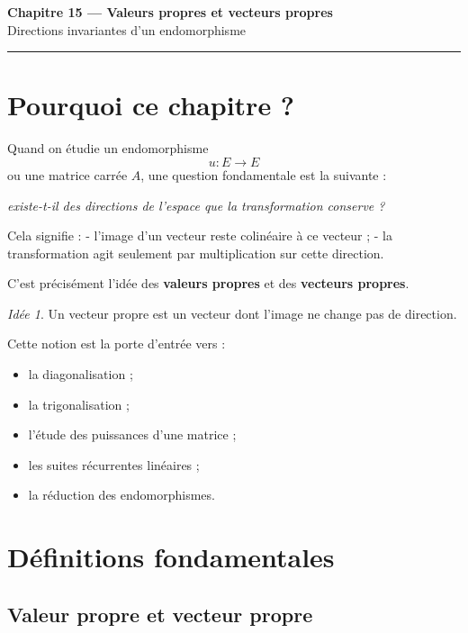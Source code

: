 \documentclass[11pt,a4paper]{article}
\theoremstyle{remark}
\newtheorem*{idee}{Idée}
\begin{document}
\begin{center}
    {\LARGE \textbf{Chapitre 15 --- Valeurs propres et vecteurs propres}}\\[0.4em]
    {\large Directions invariantes d’un endomorphisme}
\end{center}

\hrule
\vspace{1em}

\tableofcontents

\newpage

\section{Pourquoi ce chapitre ?}

Quand on étudie un endomorphisme
\[
u:E\to E
\]
ou une matrice carrée \(A\), une question fondamentale est la suivante :

\begin{center}
\textit{existe-t-il des directions de l’espace que la transformation conserve ?}
\end{center}

Cela signifie :
- l’image d’un vecteur reste colinéaire à ce vecteur ;
- la transformation agit seulement par multiplication sur cette direction.

C’est précisément l’idée des \textbf{valeurs propres} et des \textbf{vecteurs propres}.

\begin{idee}
Un vecteur propre est un vecteur dont l’image ne change pas de direction.
\end{idee}

Cette notion est la porte d’entrée vers :
\begin{itemize}
    \item la diagonalisation ;
    \item la trigonalisation ;
    \item l’étude des puissances d’une matrice ;
    \item les suites récurrentes linéaires ;
    \item la réduction des endomorphismes.
\end{itemize}

\section{Définitions fondamentales}

\subsection{Valeur propre et vecteur propre}
\end{document}
